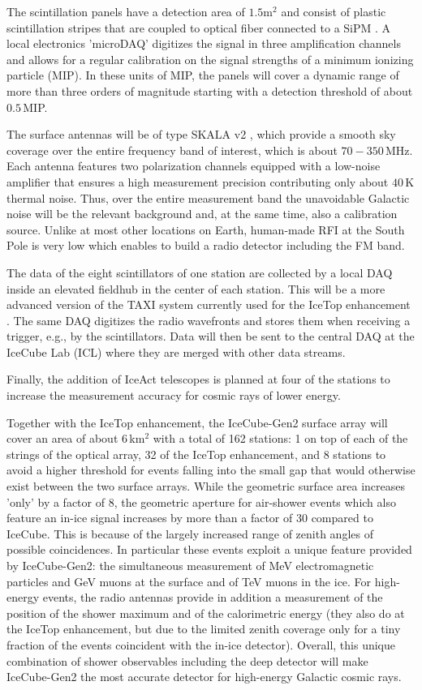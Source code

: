 \documentclass[a4paper,11pt]{article}
\begin{document}
The scintillation panels have a detection area of $1.5$m$^2$ and consist of plastic scintillation stripes that are coupled to optical fiber connected to a SiPM \cite{IceScint_ICRC2019}. 
A local electronics 'microDAQ' digitizes the signal in three amplification channels and allows for a regular calibration on the signal strengths of a minimum ionizing particle (MIP). 
In these units of MIP, the panels will cover a dynamic range of more than three orders of magnitude starting with a detection threshold of about $0.5$\,MIP.

The surface antennas will be of type SKALA v2 \cite{SKALAv2}, which provide a smooth sky coverage over the entire frequency band of interest, which is about $70-350\,$MHz. 
Each antenna features two polarization channels equipped with a low-noise amplifier that ensures a high measurement precision contributing only about $40\,$K thermal noise. 
Thus, over the entire measurement band the unavoidable Galactic noise will be the relevant background and, at the same time, also a calibration source.
Unlike at most other locations on Earth, human-made RFI at the South Pole is very low which enables to build a radio detector including the FM band.

The data of the eight scintillators of one station are collected by a local DAQ inside an elevated fieldhub in the center of each station. 
This will be a more advanced version of the TAXI system currently used for the IceTop enhancement \cite{TAXI_ICRC2021}.
The same DAQ digitizes the radio wavefronts and stores them when receiving a trigger, e.g., by the scintillators. 
Data will then be sent to the central DAQ at the IceCube Lab (ICL) where they are merged with other data streams.

Finally, the addition of IceAct telescopes \cite{IceAct_ICRC2021} is planned at four of the stations to increase the measurement accuracy for cosmic rays of lower energy. 

Together with the IceTop enhancement, the IceCube-Gen2 surface array will cover an area of about $6\,$km$^2$ with a total of 162 stations: 1 on top of each of the strings of the optical array, 32 of the IceTop enhancement, and 8 stations to avoid a higher threshold for events falling into the small gap that would otherwise exist between the two surface arrays.  
While the geometric surface area increases 'only' by a factor of 8, the geometric aperture for air-shower events which also feature an in-ice signal increases by more than a factor of 30 compared to IceCube.
This is because of the largely increased range of zenith angles of possible coincidences. 
In particular these events exploit a unique feature provided by IceCube-Gen2: the simultaneous measurement of MeV electromagnetic particles and GeV muons at the surface and of TeV muons in the ice. 
For high-energy events, the radio antennas provide in addition a measurement of the position of the shower maximum and of the calorimetric energy (they also do at the IceTop enhancement, but due to the limited zenith coverage only for a tiny fraction of the events coincident with the in-ice detector).
Overall, this unique combination of shower observables including the deep detector will make IceCube-Gen2 the most accurate detector for high-energy Galactic cosmic rays. 
\end{document}
